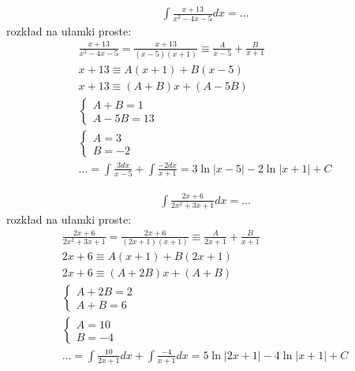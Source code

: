 

\begin{gather*}\int \frac{x+13}{x^2-4x-5}dx=\ldots\end{gather*}
rozkład na ułamki proste:
\begin{gather*}\frac{x+13}{x^2-4x-5} = \frac{x+13}{(x-5)(x+1)} \equiv \frac{A}{x-5}+\frac{B}{x+1} \\
x+13 \equiv A(x+1)+B(x-5) \\
x+13 \equiv (A+B)x+(A-5B) \\
\begin{cases} A+B=1 \\ A-5B=13 \end{cases} \\
\begin{cases} A=3 \\ B=-2 \end{cases} \\
\ldots = \int \frac{3dx}{x-5} + \int \frac{-2dx}{x+1} = 3\ln|x-5|-2\ln|x+1|+C\end{gather*}



\begin{gather*}\int \frac{2x+6}{2x^2+3x+1}dx = \ldots\end{gather*}
rozkład na ułamki proste:
\begin{gather*}\frac{2x+6}{2x^2+3x+1} = \frac{2x+6}{(2x+1)(x+1)} \equiv \frac{A}{2x+1}+\frac{B}{x+1} \\
2x+6 \equiv A(x+1)+B(2x+1) \\
2x+6 \equiv (A+2B)x+(A+B) \\
\begin{cases} A+2B=2 \\ A+B=6 \end{cases} \\
\begin{cases} A=10 \\ B=-4 \end{cases} \\
\ldots = \int \frac{10}{2x+1}dx + \int \frac{-4}{x+1}dx = 5\ln|2x+1|-4\ln|x+1|+C\\
\end{gather*}

